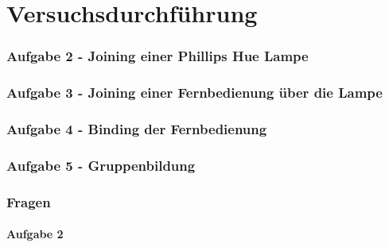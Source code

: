 \chapter{Versuchsdurchführung}

\subsection{Aufgabe 2 - Joining einer Phillips Hue Lampe}
\subsection{Aufgabe 3 - Joining einer Fernbedienung über die Lampe}
\subsection{Aufgabe 4 - Binding der Fernbedienung}
\subsection{Aufgabe 5 - Gruppenbildung}
\subsection{Fragen}
\subsubsection{Aufgabe 2}

